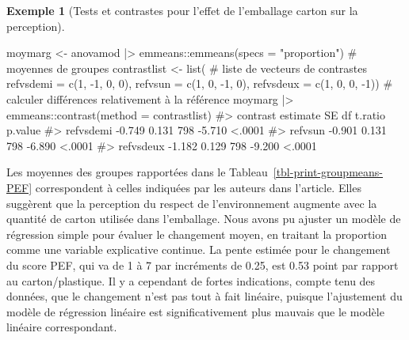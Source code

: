 \documentclass[
  11pt,
  letterpaper,
]{scrbook}
\newenvironment{Shaded}{\begin{snugshade}}{\end{snugshade}}
\newcommand{\AttributeTok}[1]{\textcolor[rgb]{0.40,0.45,0.13}{#1}}
\newcommand{\CommentTok}[1]{\textcolor[rgb]{0.37,0.37,0.37}{#1}}
\newcommand{\DecValTok}[1]{\textcolor[rgb]{0.68,0.00,0.00}{#1}}
\newcommand{\FunctionTok}[1]{\textcolor[rgb]{0.28,0.35,0.67}{#1}}
\newcommand{\NormalTok}[1]{\textcolor[rgb]{0.00,0.23,0.31}{#1}}
\newcommand{\OtherTok}[1]{\textcolor[rgb]{0.00,0.23,0.31}{#1}}
\newcommand{\SpecialCharTok}[1]{\textcolor[rgb]{0.37,0.37,0.37}{#1}}
\newcommand{\StringTok}[1]{\textcolor[rgb]{0.13,0.47,0.30}{#1}}
\theoremstyle{plain}
\theoremstyle{plain}
\theoremstyle{definition}
\newtheorem{example}{Exemple}[chapter]
\theoremstyle{definition}
\theoremstyle{remark}
\begin{document}
\begin{example}[Tests et contrastes pour l'effet de l'emballage carton
sur la
perception]
\begin{Shaded}
\begin{Highlighting}[]
\NormalTok{moymarg }\OtherTok{\textless{}{-}}\NormalTok{ anovamod }\SpecialCharTok{|\textgreater{}}
\NormalTok{  emmeans}\SpecialCharTok{::}\FunctionTok{emmeans}\NormalTok{(}\AttributeTok{specs =} \StringTok{"proportion"}\NormalTok{) }\CommentTok{\# moyennes de groupes}
\NormalTok{contrastlist }\OtherTok{\textless{}{-}} \FunctionTok{list}\NormalTok{( }\CommentTok{\# liste de vecteurs de contrastes}
   \AttributeTok{refvsdemi =} \FunctionTok{c}\NormalTok{(}\DecValTok{1}\NormalTok{, }\SpecialCharTok{{-}}\DecValTok{1}\NormalTok{, }\DecValTok{0}\NormalTok{, }\DecValTok{0}\NormalTok{),}
   \AttributeTok{refvsun =}  \FunctionTok{c}\NormalTok{(}\DecValTok{1}\NormalTok{, }\DecValTok{0}\NormalTok{, }\SpecialCharTok{{-}}\DecValTok{1}\NormalTok{, }\DecValTok{0}\NormalTok{),}
   \AttributeTok{refvsdeux =}  \FunctionTok{c}\NormalTok{(}\DecValTok{1}\NormalTok{, }\DecValTok{0}\NormalTok{, }\DecValTok{0}\NormalTok{, }\SpecialCharTok{{-}}\DecValTok{1}\NormalTok{))}
\CommentTok{\# calculer différences relativement à la référence}
\NormalTok{moymarg }\SpecialCharTok{|\textgreater{}}\NormalTok{ emmeans}\SpecialCharTok{::}\FunctionTok{contrast}\NormalTok{(}\AttributeTok{method =}\NormalTok{ contrastlist)}
\CommentTok{\#\textgreater{}  contrast  estimate    SE  df t.ratio p.value}
\CommentTok{\#\textgreater{}  refvsdemi   {-}0.749 0.131 798  {-}5.710  \textless{}.0001}
\CommentTok{\#\textgreater{}  refvsun     {-}0.901 0.131 798  {-}6.890  \textless{}.0001}
\CommentTok{\#\textgreater{}  refvsdeux   {-}1.182 0.129 798  {-}9.200  \textless{}.0001}
\end{Highlighting}
\end{Shaded}

Les moyennes des groupes rapportées dans le
Tableau~\ref{tbl-print-groupmeans-PEF} correspondent à celles indiquées
par les auteurs dans l'article. Elles suggèrent que la perception du
respect de l'environnement augmente avec la quantité de carton utilisée
dans l'emballage. Nous avons pu ajuster un modèle de régression simple
pour évaluer le changement moyen, en traitant la proportion comme une
variable explicative continue. La pente estimée pour le changement du
score PEF, qui va de 1 à 7 par incréments de 0.25, est 0.53 point par
rapport au carton/plastique. Il y a cependant de fortes indications,
compte tenu des données, que le changement n'est pas tout à fait
linéaire, puisque l'ajustement du modèle de régression linéaire est
significativement plus mauvais que le modèle linéaire correspondant.


\end{example}
\end{document}
